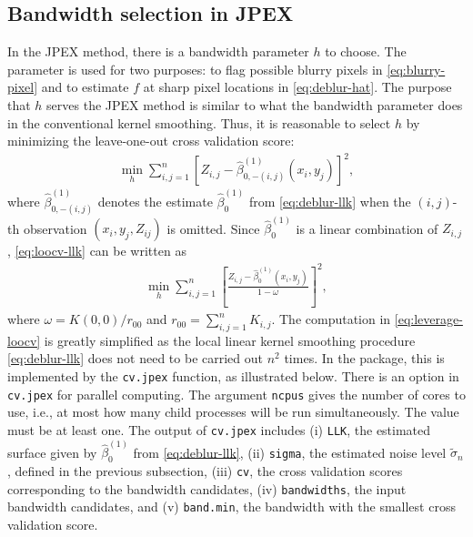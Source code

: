 \subsection{Bandwidth selection in JPEX}\label{sec:deblur.bandwidth}

In the JPEX method, there is a bandwidth parameter \(h\) to choose. The parameter is used for two purposes: to flag possible blurry pixels in \eqref{eq:blurry-pixel} and to estimate \(f\) at sharp pixel locations in \eqref{eq:deblur-hat}. The purpose that \(h\) serves the JPEX method is similar to what the bandwidth parameter does in the conventional kernel smoothing. Thus, it is reasonable to select \(h\) by minimizing the leave-one-out cross validation score:
\begin{align}
  \label{eq:loocv-llk}
  \min_h \sum_{i,j=1}^n \left[ Z_{i, j} - \widehat{\beta}^{(1)}_{0,-(i, j)}(x_i, y_j) \right]^2,
\end{align}
where \(\widehat{\beta}^{(1)}_{0,-(i,j)}\) denotes the estimate \(\widehat{\beta}_0^{(1)}\) from \eqref{eq:deblur-llk} when the \((i, j)\)-th observation \((x_i, y_j, Z_{ij})\) is omitted. Since \(\widehat{\beta}_0^{(1)}\) is a linear combination of \(Z_{i, j}\), \eqref{eq:loocv-llk} can be written as
\begin{align}
  \label{eq:leverage-loocv}
  \min_h \sum_{i,j=1}^n \left[ \frac{Z_{i, j}- \widehat{\beta}^{(1)}_0(x_i, y_j)}{1 - \omega} \right]^2,
\end{align}
where \(\omega=K(0,0)/r_{00}\) and \(r_{00}=\sum_{i, j = 1}^n K_{i, j}\). The computation in \eqref{eq:leverage-loocv} is greatly simplified as the local linear kernel smoothing procedure \eqref{eq:deblur-llk} does not need to be carried out \(n^2\) times. In the  package, this is implemented by the \texttt{cv.jpex} function, as illustrated below. There is an option in \texttt{cv.jpex} for parallel computing. The argument \texttt{ncpus} gives the number of cores to use, i.e., at most how many child processes will be run simultaneously. The value must be at least one. The output of \texttt{cv.jpex} includes (i) \texttt{LLK}, the estimated surface given by \(\widehat{\beta}_0^{(1)}\) from \eqref{eq:deblur-llk}, (ii) \texttt{sigma}, the estimated noise level \(\tilde{\sigma}_n\), defined in the previous subsection, (iii) \texttt{cv}, the cross validation scores corresponding to the bandwidth candidates, (iv) \texttt{bandwidths}, the input bandwidth candidates, and (v) \texttt{band.min}, the bandwidth with the smallest cross validation score.

